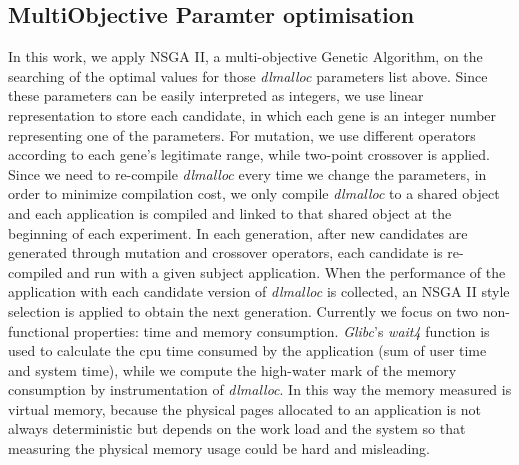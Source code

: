 \subsection{MultiObjective Paramter optimisation}
\label{sec_nsgaii}
In this work, we apply NSGA II\cite{996017}, a multi-objective Genetic Algorithm, on the searching of the optimal values for those \emph{dlmalloc} parameters list above.
Since these parameters can be easily interpreted as integers, we use linear representation to store each candidate, in which each gene is an integer number representing one of the parameters. For mutation, we use different operators according to each gene's legitimate range, while two-point crossover is applied.
Since we need to re-compile \emph{dlmalloc} every time we change the parameters, in order to minimize compilation cost, we only compile \emph{dlmalloc} to a shared object and each application is compiled and linked to that shared object at the beginning of each experiment. In each generation, after new candidates are generated through mutation and crossover operators, each candidate is re-compiled and run with a given subject application. When the performance of the application with each candidate version of \emph{dlmalloc} is collected, an NSGA II style selection is applied to obtain the next generation.
Currently we focus on two non-functional properties: time and memory consumption. \emph{Glibc}'s \emph{wait4} function is used to calculate the cpu time consumed by the application (sum of user time and system time), while we compute the high-water mark of the memory consumption by instrumentation of \emph{dlmalloc}. In this way the memory measured is virtual memory, because the physical pages allocated to an application is not always deterministic but depends on the work load and the system so that measuring the physical memory usage could be hard and misleading.
